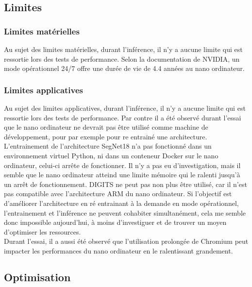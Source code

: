\subsection{Limites}
\subsubsection{Limites matérielles}
\noindent Au sujet des limites matérielles, durant l'inférence, il n'y a aucune limite qui est ressortie lors des tests de performance. Selon la documentation de NVIDIA, un mode opérationnel 24/7 offre une durée de vie de 4.4 années au nano ordinateur.
\subsubsection{Limites applicatives}
\noindent Au sujet des limites applicatives, durant l'inférence, il n'y a aucune limite qui est ressortie lors des tests de performance. Par contre il a été observé durant l'essai que le nano ordinateur ne devrait pas être utilisé comme machine de développement, pour par exemple pour re entrainé une architecture. L'entrainement de l'architecture SegNet18 n'a pas fonctionné dans un environnement virtuel Python, ni dans un conteneur Docker sur le nano ordinateur, celui-ci arrête de fonctionner. Il n'y a pas eu d'investigation, mais il semble que le nano ordinateur atteind une limite mémoire qui le ralenti jusqu'à un arrêt de fonctionnement. DIGITS ne peut pas non plus être utilisé, car il n'est pas compatible avec l'architecture ARM du nano ordinateur. Si l'objectif est d'améliorer l'architecture en ré entrainant à la demande en mode opérationnel, l'entrainement et l'inférence ne peuvent cohabiter simultanément, cela me semble donc impossible aujourd'hui, à moins d'investiguer et de trouver un moyen d'optimiser les ressources.
\vspace{\baselineskip}
\\
\noindent Durant l'essai, il a aussi été observé que l'utilisation prolongée de Chromium peut impacter les performances du nano ordinateur en le ralentissant grandement. 
\subsection{Optimisation}
